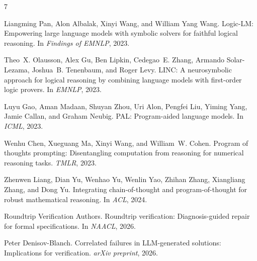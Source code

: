 \documentclass[11pt,a4paper]{article}
\begin{document}

\begin{thebibliography}{7}

Liangming Pan, Alon Albalak, Xinyi Wang, and William Yang Wang.
\newblock Logic-LM: Empowering large language models with symbolic solvers for faithful logical reasoning.
\newblock In \emph{Findings of EMNLP}, 2023.

Theo~X. Olausson, Alex Gu, Ben Lipkin, Cedegao~E. Zhang, Armando Solar-Lezama, Joshua~B. Tenenbaum, and Roger Levy.
\newblock LINC: A neurosymbolic approach for logical reasoning by combining language models with first-order logic provers.
\newblock In \emph{EMNLP}, 2023.

Luyu Gao, Aman Madaan, Shuyan Zhou, Uri Alon, Pengfei Liu, Yiming Yang, Jamie Callan, and Graham Neubig.
\newblock PAL: Program-aided language models.
\newblock In \emph{ICML}, 2023.

Wenhu Chen, Xueguang Ma, Xinyi Wang, and William~W. Cohen.
\newblock Program of thoughts prompting: Disentangling computation from reasoning for numerical reasoning tasks.
\newblock \emph{TMLR}, 2023.

Zhenwen Liang, Dian Yu, Wenhao Yu, Wenlin Yao, Zhihan Zhang, Xiangliang Zhang, and Dong Yu.
\newblock Integrating chain-of-thought and program-of-thought for robust mathematical reasoning.
\newblock In \emph{ACL}, 2024.

Roundtrip Verification Authors.
\newblock Roundtrip verification: Diagnosis-guided repair for formal specifications.
\newblock In \emph{NAACL}, 2026.

Peter Denisov-Blanch.
\newblock Correlated failures in LLM-generated solutions: Implications for verification.
\newblock \emph{arXiv preprint}, 2026.

\end{thebibliography}
\end{document}
